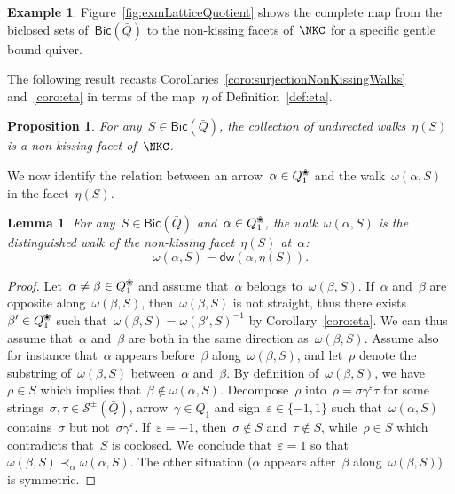 \documentclass{memo-l}
\newtheorem{proposition}[theorem]{Proposition}
\newtheorem{lemma}[theorem]{Lemma}
\theoremstyle{definition}
\newtheorem{example}[theorem]{Example}
\newcommand{\fref}[1]{Figure~\ref{#1}} %
\newcommand{\blossom}{^\text{\ding{96}}} %
\newcommand{\strings}{\mathcal{S}} %
\newcommand{\distinguishedWalk}[2]{\mathsf{dw}(#1,#2)} %
\newcommand{\Bicl}[1]{\mathsf{Bic}(#1)} %
\begin{document}
\begin{example}
\fref{fig:exmLatticeQuotient} shows the complete map from the biclosed sets of~$\Bicl{\bar Q}$ to the non-kissing facets of~$\NKC$ for a specific gentle bound quiver.
\end{example}

The following result recasts Corollaries~\ref{coro:surjectionNonKissingWalks} and~\ref{coro:eta} in terms of the map~$\eta$ of Definition~\ref{def:eta}.

\begin{proposition}
For any~$S \in \Bicl{\bar Q}$, the collection of undirected walks~$\eta(S)$ is a non-kissing facet of~$\NKC$.
\end{proposition}

We now identify the relation between an arrow~$\alpha \in Q_1\blossom$ and the walk~$\omega(\alpha,S)$ in the facet~$\eta(S)$.

\begin{lemma}
\label{lem:distinguishedWalkEta}
For any~$S \in \Bicl{\bar Q}$ and~$\alpha \in Q_1\blossom$, the walk~$\omega(\alpha,S)$ is the distinguished walk of the non-kissing facet~$\eta(S)$ at~$\alpha$:
\[
\omega(\alpha,S) = \distinguishedWalk{\alpha}{\eta(S)}.
\]
\end{lemma}

\begin{proof}
Let~$\alpha \ne \beta \in Q_1\blossom$ and assume that~$\alpha$ belongs to~$\omega(\beta,S)$.
If~$\alpha$ and~$\beta$ are opposite along~$\omega(\beta,S)$, then~$\omega(\beta,S)$ is not straight, thus there exists~$\beta' \in Q_1\blossom$ such that~${\omega(\beta,S) = \omega(\beta',S)^{-1}}$ by Corollary~\ref{coro:eta}.
We can thus assume that~$\alpha$ and~$\beta$ are both in the same direction as~$\omega(\beta,S)$.
Assume also for instance that~$\alpha$ appears before~$\beta$ along~$\omega(\beta,S)$, and let~$\rho$ denote the substring of~$\omega(\beta,S)$ between~$\alpha$ and~$\beta$.
By definition of~$\omega(\beta,S)$, we have~$\rho \in S$ which implies that~$\beta \notin \omega(\alpha,S)$.
Decompose~$\rho$ into~$\rho = \sigma \gamma^\varepsilon \tau$ for some strings~$\sigma, \tau \in \strings^\pm(\bar Q)$, arrow~$\gamma \in Q_1$ and sign~$\varepsilon \in \{-1,1\}$ such that~$\omega(\alpha,S)$ contains~$\sigma$ but not~$\sigma \gamma^\varepsilon$.
If~$\varepsilon = -1$, then~$\sigma \notin S$ and~$\tau \notin S$, while~$\rho \in S$ which contradicts that~$S$ is coclosed.
We conclude that~$\varepsilon = 1$ so that~$\omega(\beta,S) \prec_\alpha \omega(\alpha,S)$.
The other situation ($\alpha$ appears after~$\beta$ along~$\omega(\beta,S)$) is symmetric.
\end{proof}
\end{document}
